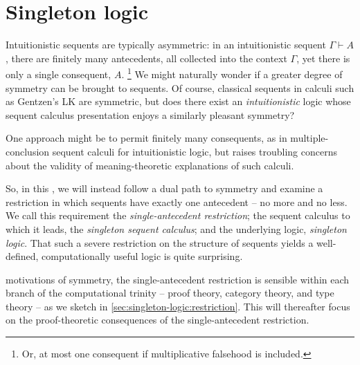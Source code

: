 \chapter{Singleton logic}\label{ch:singleton-logic}

Intuitionistic sequents are typically asymmetric:
in an intuitionistic sequent $\Gamma \vdash A$, there are finitely many antecedents, all collected into the context $\Gamma$, yet there is only a single consequent, $A$.%
\footnote{Or, at most one consequent if multiplicative falsehood is included.}
We might naturally wonder if a greater degree of symmetry can be brought to sequents.
Of course, classical sequents in calculi such as Gentzen's LK\autocite{Gentzen:} are symmetric, but does there exist an \emph{intuitionistic} logic whose sequent calculus presentation enjoys a similarly pleasant symmetry?

One approach might be to permit finitely many consequents, as in multiple-conclusion sequent calculi for intuitionistic logic\autocite{??}, but \citeauthor{Steinberger:JPL11}\autocite{Steinberger:JPL11} raises troubling concerns about the validity of meaning-theoretic explanations of such calculi.

So, in this , we will instead follow a dual path to symmetry and examine a restriction in which sequents have exactly one antecedent -- no more and no less.
We call this requirement the \emph{single-antecedent restriction}; the sequent calculus to which it leads, the \emph{singleton sequent calculus}; and the underlying logic, \emph{singleton logic}.
That such a severe restriction on the structure of sequents yields a well-defined, computationally useful logic is quite surprising.

 motivations of symmetry, the single-antecedent restriction is sensible within each branch of the computational trinity\autocite{Harper:??} -- proof theory, category theory, and type theory -- as we sketch in \cref{sec:singleton-logic:restriction}.
This  will thereafter focus on the proof-theoretic consequences of the single-antecedent restriction.

